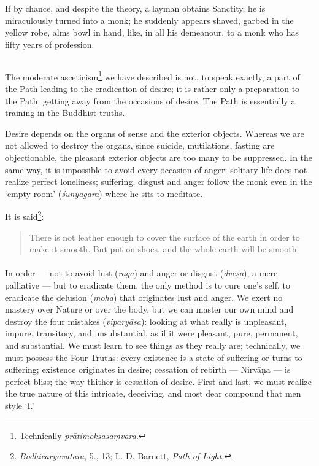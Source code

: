 \documentclass[a4paper, 11pt, oneside, english, landscape]{article}
\begin{document}
If by chance, and despite the theory, a layman obtains Sanctity, he is miraculously turned into a monk; he suddenly appears shaved, garbed in the yellow robe, alms bowl in hand, like, in all his demeanour, to a monk who has fifty years of profession.

\subsection{}
\paragraph{}
The moderate asceticism\footnote{Technically \emph{prātimokṣasaṃvara}.} we have described is not, to speak exactly, a part of the Path leading to the eradication of desire; it is rather only a preparation to the Path: getting away from the occasions of desire. The Path is essentially a training in the Buddhist truths.

Desire depends on the organs of sense and the exterior objects. Whereas we are not allowed to destroy the organs, since suicide, mutilations, fasting are objectionable, the pleasant exterior objects are too many to be suppressed. In the same way, it is impossible to avoid every occasion of anger; solitary life does not realize perfect loneliness; suffering, disgust and anger follow the monk even in the `empty room' (\emph{śūnyāgāra}) where he sits to meditate.

It is said\footnote{\emph{Bodhicaryāvatāra}, 5., 13; L. D. Barnett, \emph{Path of Light}.}:
\begin{quotation}
\small
There is not leather enough to cover the surface of the earth in order to make it smooth. But put on shoes, and the whole earth will be smooth.
\end{quotation}
\paragraph{}
In order --- not to avoid lust (\emph{rāga}) and anger or disgust (\emph{dveṣa}), a mere palliative --- but to eradicate them, the only method is to cure one's self, to eradicate the delusion (\emph{moha}) that originates lust and anger. We exert no mastery over Nature or over the body, but we can master our own mind and destroy the four mistakes (\emph{viparyāsa}): looking at what really is unpleasant, impure, transitory, and unsubstantial, as if it were pleasant, pure, permanent, and substantial. We must learn to see things as they really are; technically, we must possess the Four Truths: every existence is a state of suffering or turns to suffering; existence originates in desire; cessation of rebirth --- Nirvāṇa --- is perfect bliss; the way thither is cessation of desire. First and last, we must realize the true nature of this intricate, deceiving, and most dear compound that men style `I.'
\end{document}
